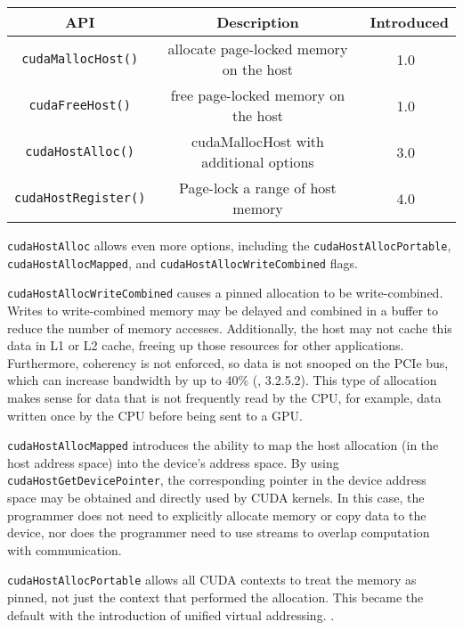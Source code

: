 \begin{table}[h]
	\centering
	\caption[CUDA Pinned Memory-Management APIs]{}
	\label{tab:cuda-pinned-apis}
	\begin{tabular}{|c|c|c|}
		\hline
		\textbf{API}                & \textbf{Description}                    & \textbf{Introduced} \\ \hline
		\texttt{cudaMallocHost()}   & allocate page-locked memory on the host & 1.0~\cite{nvidia2007cuda10} \\ \hline
		\texttt{cudaFreeHost()}     & free page-locked memory on the host     & 1.0~\cite{nvidia2007cuda10} \\ \hline
		\texttt{cudaHostAlloc()}    & cudaMallocHost with additional options  & 3.0~\cite{nvidia2010cuda30} \\ \hline
		\texttt{cudaHostRegister()} & Page-lock a range of host memory        & 4.0~\cite{nvidia2011cudac40} \\ \hline
	\end{tabular}
\end{table}

\texttt{cudaHostAlloc} allows even more options, including the \texttt{cudaHostAllocPortable}, \texttt{cudaHostAllocMapped}, and \texttt{cudaHostAllocWriteCombined} flags.

\texttt{cudaHostAllocWriteCombined} causes a pinned allocation to be write-combined.
Writes to write-combined memory may be delayed and combined in a buffer to reduce the number of memory accesses.
Additionally, the host may not cache this data in L1 or L2 cache, freeing up those resources for other applications. 
Furthermore, coherency is not enforced, so data is not snooped on the PCIe bus, which can increase bandwidth by up to 40\% (\cite{nvidia2010cuda30}, 3.2.5.2).
This type of allocation makes sense for data that is not frequently read by the CPU, for example, data written once by the CPU before being sent to a GPU.

\texttt{cudaHostAllocMapped} introduces the ability to map the host allocation (in the host address space) into the device's address space.
By using \texttt{cudaHostGetDevicePointer}, the corresponding pointer in the device address space may be obtained and directly used by CUDA kernels.
In this case, the programmer does not need to explicitly allocate memory or copy data to the device, nor does the programmer need to use streams to overlap computation with communication.

\texttt{cudaHostAllocPortable} allows all CUDA contexts to treat the memory as pinned, not just the context that performed the allocation.
This became the default with the introduction of unified virtual addressing. .

